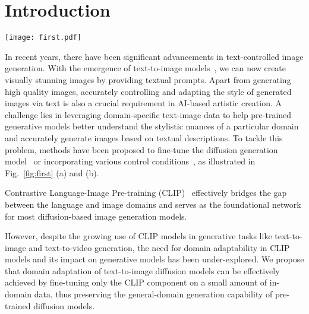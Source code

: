 \section{Introduction}
\label{sec:intro}

\begin{figure*}[ht]
\begin{center}
\texttt{[image: first.pdf]} 
\end{center}
   \caption{Comparison of different approaches to leveraging in-domain text and image data for fine-tuning. Previously common fine-tuning methods include: (a) fine-tuning only the generator, (b) fine-tuning only the text encoder, and (c) using an adapter to decouple category features from the text encoder and combine them with the original text features. (d) Our Control-CLIP utilizes a decoupled design to learn both category and style features for generation models.}
\label{fig:first}
\end{figure*}

In recent years, there have been significant advancements in text-controlled image generation. With the emergence of text-to-image models~\cite{rombach2022high, jia2024finger,huang2025semantic,jia2023fingerstr,wang2023improving}, we can now create visually stunning images by providing textual prompts. 
Apart from generating high quality images, accurately controlling and adapting the style of generated images via text is also a crucial requirement in AI-based artistic creation. A challenge lies in leveraging domain-specific text-image data to help pre-trained generative models better understand the stylistic nuances of a particular domain and accurately generate images based on textual descriptions.
To tackle this problem, methods have been proposed to fine-tune the diffusion generation model~\cite{zhai2023investigating} or incorporating various control conditions~\cite{tumanyan2023plug}, as illustrated in Fig.~\ref{fig:first} (a) and (b).

Contrastive Language-Image Pre-training (CLIP)~\cite{radford2021learning} effectively bridges the gap between the language and image domains and serves as the foundational network for most diffusion-based image generation models.

However, despite the growing use of CLIP models in generative tasks like text-to-image and text-to-video generation, the need for domain adaptability in CLIP models and its impact on generative models has been under-explored. We propose that domain adaptation of text-to-image diffusion models can be effectively achieved by fine-tuning only the CLIP component on a small amount of in-domain data, thus preserving the general-domain generation capability of pre-trained diffusion models.

